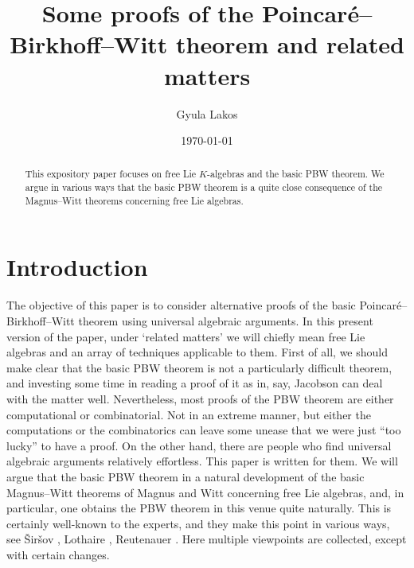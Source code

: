 \documentclass[11pt,a4paper]{amsart}
\newcommand{\plabel}[1]{ \label{#1}}
\newcommand{\plabel}[1]{ \label{#1}\rlap{\smash{${}^{^{[#1]}}$}}}
\newcommand{\plabel}[1]{ \label{#1}}
\theoremstyle{definition}
\theoremstyle{plain}
\begin{document}
\title{Some proofs of the Poincar\'e--Birkhoff--Witt theorem and related matters}
\date{\today}
\author{Gyula Lakos}
\address{Alfréd Rényi Institute of Mathematics}
\begin{abstract}
This expository paper focuses on free Lie $K$-algebras and the basic PBW theorem.
We argue in various ways that the basic PBW theorem is a quite close consequence of the Magnus--Witt theorems concerning free Lie algebras.
\end{abstract}
\maketitle



\section*{Introduction}\plabel{sec:intro}

The objective of this paper is to consider alternative proofs of the basic Poincar\'e--Birkhoff--Witt theorem
 using universal algebraic arguments.
In this present version of the paper, under `related matters' we will chiefly mean free Lie algebras
 and an array of techniques applicable to them.
First of all, we should make clear that the basic PBW theorem is not a particularly difficult theorem,
 and investing some time in reading a proof of it as in, say, Jacobson \cite{J} can deal with the matter well.
Nevertheless, most proofs of the PBW theorem are either computational or combinatorial.
Not in an extreme manner, but either the computations or the combinatorics can leave some unease that
 we were just ``too lucky'' to have a proof.
On the other hand, there are people who find universal algebraic arguments relatively effortless.
This paper is written for them.
We will argue that the basic PBW theorem in a natural development of the basic Magnus--Witt theorems
of Magnus \cite{MM} and Witt \cite{W} concerning free Lie algebras,
 and, in particular, one obtains the PBW theorem in this venue quite naturally.
This is certainly well-known to the experts, and
 they make this point in various ways, see \v{S}ir\v{s}ov \cite{S2}, Lothaire \cite{Lot}, Reutenauer \cite{R}.
Here multiple viewpoints are collected, except with certain changes.
\end{document}
